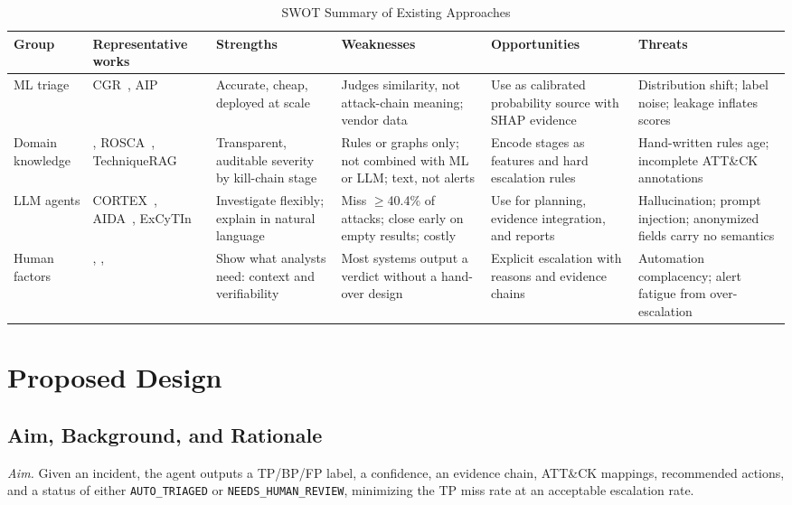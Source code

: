 \documentclass[conference]{IEEEtran}
\begin{document}
\begin{table}[t]
\caption{SWOT Summary of Existing Approaches}
\label{tab:swot}
\centering
\footnotesize
\setlength{\tabcolsep}{4pt}
\begin{tabular}{@{}p{2.0cm}p{2.2cm}p{2.9cm}p{3.1cm}p{3.1cm}p{3.0cm}@{}}
\toprule
\textbf{Group} & \textbf{Representative works} & \textbf{Strengths}
& \textbf{Weaknesses} & \textbf{Opportunities} & \textbf{Threats} \\
\midrule
ML triage & CGR~\cite{freitas2024cgr}, AIP~\cite{freitas2026aip}
& Accurate, cheap, deployed at scale
& Judges similarity, not attack-chain meaning; vendor data
& Use as calibrated probability source with SHAP evidence
& Distribution shift; label noise; leakage inflates scores~\cite{arp2022} \\
\addlinespace
Domain knowledge & \cite{sadlek2025}, ROSCA~\cite{garcia2025rosca}, TechniqueRAG~\cite{lekssays2025}
& Transparent, auditable severity by kill-chain stage
& Rules or graphs only; not combined with ML or LLM; text, not alerts
& Encode stages as features and hard escalation rules
& Hand-written rules age; incomplete ATT\&CK annotations \\
\addlinespace
LLM agents & CORTEX~\cite{wei2025cortex}, AIDA~\cite{tsegai2026}, ExCyTIn~\cite{wu2025excytin}
& Investigate flexibly; explain in natural language
& Miss $\geq$40.4\% of attacks; close early on empty results; costly
& Use for planning, evidence integration, and reports
& Hallucination; prompt injection; anonymized fields carry no semantics \\
\addlinespace
Human factors & \cite{tilbury2026}, \cite{kersten2025}, \cite{banstola2026}
& Show what analysts need: context and verifiability
& Most systems output a verdict without a hand-over design
& Explicit escalation with reasons and evidence chains
& Automation complacency; alert fatigue from over-escalation \\
\bottomrule
\end{tabular}
\end{table}

\section{Proposed Design}\label{sec:design}

\subsection{Aim, Background, and Rationale}
\emph{Aim.} Given an incident, the agent outputs a TP/BP/FP label, a
confidence, an evidence chain, ATT\&CK mappings, recommended actions,
and a status of either \texttt{AUTO\_TRIAGED} or
\texttt{NEEDS\_HUMAN\_REVIEW}, minimizing the TP miss rate at an
acceptable escalation rate.
\end{document}
